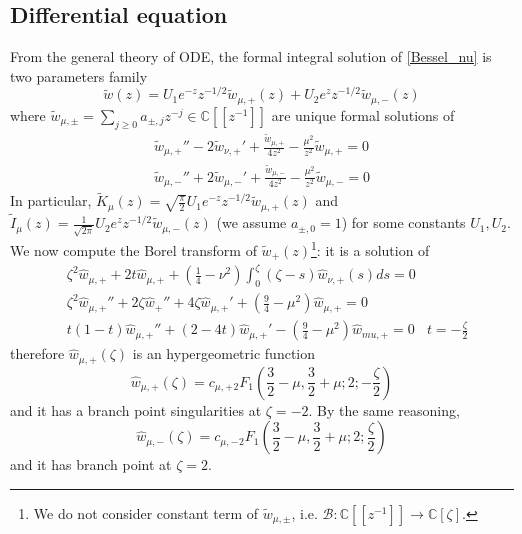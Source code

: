 \documentclass{article}
\newcommand{\C}{\mathbb{C}}
\begin{document}
\subsection{Differential equation}
From the general theory of ODE, the formal integral solution of \eqref{Bessel_nu} is two parameters family 
\begin{equation}
\tilde{w}(z)=U_1e^{-z}z^{-1/2}\tilde{w}_{\mu,+}(z)+U_2e^{z}z^{-1/2}\tilde{w}_{\mu,-}(z)
\end{equation} 
where $\tilde{w}_{\mu,\pm}=\sum_{j\geq 0}a_{\pm,j}z^{-j}\in\C[\![z^{-1}]\!]$ are unique formal solutions of
\begin{align*}
\tilde{w}_{\mu,+}''-2\tilde{w}_{\nu,+}'+\frac{\tilde{w}_{\mu,+}}{4z^2}-\frac{\mu^2}{z^2}\tilde{w}_{\mu,+}=0\\
\tilde{w}_{\mu,-}''+2\tilde{w}_{\mu,-}'+\frac{\tilde{w}_{\mu,-}}{4z^2}-\frac{\mu^2}{z^2}\tilde{w}_{\mu,-}=0
\end{align*} 
In particular, $\tilde{K}_{\mu}(z)=\sqrt{\frac{\pi}{2}}U_1e^{-z}z^{-1/2}\tilde{w}_{\mu,+}(z)$ and $\tilde{I}_\mu(z)=\frac{1}{\sqrt{2\pi}}U_2 e^zz^{-1/2}\tilde{w}_{\mu,-}(z)$ (we assume $a_{\pm,0}=1$) for some constants $U_1, U_2$. We now compute the Borel transform of $\tilde{w}_+(z)$\footnote{We do not consider constant term of $\tilde{w}_{\mu,\pm}$, i.e. $\mathcal{B}:\C[\![z^{-1}]\!]\to \C[\zeta]$.}: it is a solution of 
\begin{align*}
&\zeta^2\hat{w}_{\mu,+}+2t\hat{w}_{\mu,+}+\left(\frac{1}{4}-\nu^2\right)\int_0^{\zeta}(\zeta-s)\hat{w}_{\nu,+}(s)ds=0 &\\
&\zeta^2\hat{w}_{\mu,+}''+2\zeta\hat{w}_+''+4\zeta\hat{w}_{\mu,+}'+\left(\frac{9}{4}-\mu^2\right)\hat{w}_{\mu,+}=0 & \\
&t(1-t)\hat{w}_{\mu,+}''+(2-4t)\hat{w}_{\mu,+}'-\left(\frac{9}{4}-\mu^2\right)\hat{w}_{mu,+}=0 & t=-\frac{\zeta}{2}
\end{align*} 
therefore $\hat{w}_{\mu,+}(\zeta)$ is an hypergeometric function
\begin{equation}
\hat{w}_{\mu,+}(\zeta)=c_{\mu,+} {}_2F_1\left(\frac{3}{2}-\mu,\frac{3}{2}+\mu;2;-\frac{\zeta}{2}\right)
\end{equation}
and it has a branch point singularities at $\zeta=-2$. By the same reasoning, 
\begin{equation}
\hat{w}_{\mu,-}(\zeta)=c_{\mu,-} {}_2F_1\left(\frac{3}{2}-\mu,\frac{3}{2}+\mu;2;\frac{\zeta}{2}\right)
\end{equation} 
and it has branch point at $\zeta=2$. 
\end{document}
